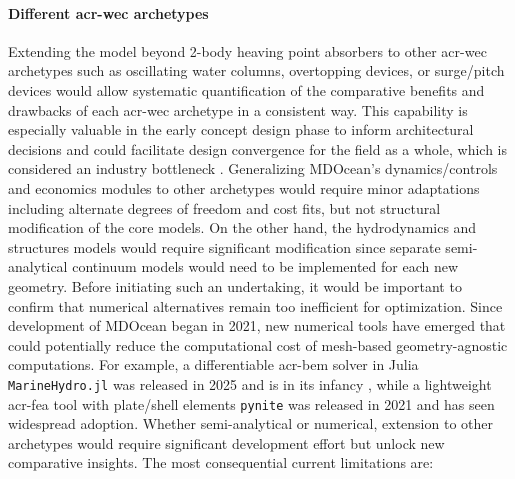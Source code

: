     \paragraph{Different \gls{acr-wec} archetypes}
    Extending the model beyond 2-body heaving point absorbers to other \gls{acr-wec} archetypes such as oscillating water columns, overtopping devices, or surge/pitch devices would allow systematic quantification of the comparative benefits and drawbacks of each \gls{acr-wec} archetype in a consistent way.
    This capability is especially valuable in the early concept design phase to inform architectural decisions and could facilitate design convergence for the field as a whole, which is considered an industry bottleneck \citep{caio_tackling_2019}.
    Generalizing MDOcean's dynamics/controls and economics modules to other archetypes would require minor adaptations including alternate degrees of freedom and cost fits, but not structural modification of the core models.
    On the other hand, the hydrodynamics and structures models would require significant modification since separate semi-analytical continuum models would need to be implemented for each new geometry.
    Before initiating such an undertaking, it would be important to confirm that numerical alternatives remain too inefficient for optimization.
    Since development of MDOcean began in 2021, new numerical tools have emerged that could potentially reduce the computational cost of mesh-based geometry-agnostic computations.
    For example, a differentiable \gls{acr-bem} solver in Julia \texttt{MarineHydro.jl} was released in 2025 and is in its infancy \citep{khanal_fully_2025}, while a lightweight \gls{acr-fea} tool with plate/shell elements \texttt{pynite} was released in 2021 and has seen widespread adoption.
    Whether semi-analytical or numerical, extension to other archetypes would require significant development effort but unlock new comparative insights.
\else
    The most consequential current limitations are:
